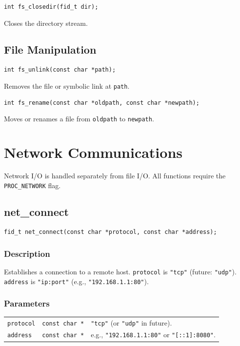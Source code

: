 \documentclass[12pt,a4paper]{article}
\begin{document}
\begin{verbatim}
int fs_closedir(fid_t dir);
\end{verbatim}
Closes the directory stream.

\subsection{File Manipulation}
\begin{verbatim}
int fs_unlink(const char *path);
\end{verbatim}
Removes the file or symbolic link at \texttt{path}.

\begin{verbatim}
int fs_rename(const char *oldpath, const char *newpath);
\end{verbatim}
Moves or renames a file from \texttt{oldpath} to \texttt{newpath}.

\section{Network Communications}
\label{sec:network}

Network I/O is handled separately from file I/O. All functions require the \texttt{PROC\_NETWORK} flag.

\subsection{net\_connect}
\begin{lstlisting}
fid_t net_connect(const char *protocol, const char *address);
\end{lstlisting}

\subsubsection{Description}
Establishes a connection to a remote host. \texttt{protocol} is \texttt{"tcp"} (future: \texttt{"udp"}). \texttt{address} is \texttt{"ip:port"} (e.g., \texttt{"192.168.1.1:80"}).

\subsubsection{Parameters}
\begin{tabularx}{\textwidth}{|l|l|X|}
\hline
\verb|protocol| & \verb|const char *| & \texttt{"tcp"} (or \texttt{"udp"} in future). \\
\verb|address| & \verb|const char *| & e.g., \texttt{"192.168.1.1:80"} or \texttt{"[::1]:8080"}. \\
\hline
\end{tabularx}
\end{document}
